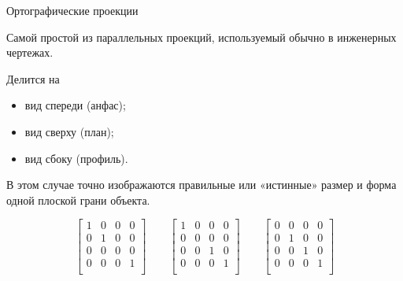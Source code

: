 \documentclass{beamer}
\begin{document}
	\begin{frame}{Ортографические проекции}
	
		Самой простой из параллельных проекций, используемый обычно в инженерных чертежах. 

		Делится на 
		\begin{itemize}
			\item вид спереди (анфас);
			\item вид сверху (план);
			\item вид сбоку (профиль).
		\end{itemize}
		
		В этом случае точно изображаются правильные или «истинные» размер и форма одной плоской грани объекта.

		\[
			\begin{bmatrix}
					1 & 0 & 0 & 0 \\
					0 & 1 & 0 & 0 \\
					0 & 0 & 0 & 0 \\
					0 & 0 & 0 & 1 \\
			\end{bmatrix}
			\qquad
			\begin{bmatrix}
				1 & 0 & 0 & 0 \\
				0 & 0 & 0 & 0 \\
				0 & 0 & 1 & 0 \\
				0 & 0 & 0 & 1 \\
			\end{bmatrix}
			\qquad
			\begin{bmatrix}
					0 & 0 & 0 & 0 \\
					0 & 1 & 0 & 0 \\
					0 & 0 & 1 & 0 \\
					0 & 0 & 0 & 1 \\
			\end{bmatrix}			
	 \]

	
	\end{frame}
\end{document}
